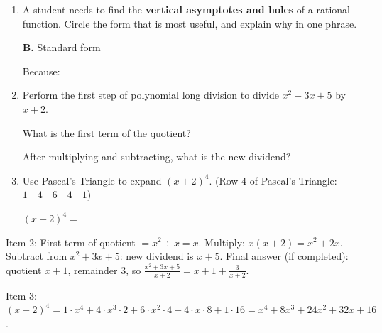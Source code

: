 \documentclass[10pt]{article}
\begin{document}
\namedateperiod

\vspace{0.14in}

\begin{enumerate}[itemsep=16pt]

\item A student needs to find the \textbf{vertical asymptotes and holes} of a rational function.
      Circle the form that is most useful, and explain why in one phrase.

      \medskip
       \qquad\qquad \textbf{B.} Standard form

      \vspace{0.06in}
      Because: 

\item Perform the first step of polynomial long division to divide $x^2 + 3x + 5$ by $x + 2$.

      What is the first term of the quotient? 

      After multiplying and subtracting, what is the new dividend? 

\item Use Pascal's Triangle to expand $(x + 2)^4$.
      (Row 4 of Pascal's Triangle: $1 \quad 4 \quad 6 \quad 4 \quad 1$)

      \vspace{0.06in}
      $(x+2)^4 = $ 

\end{enumerate}

\begin{teachernote}
Item 2: First term of quotient $= x^2 \div x = x$. Multiply: $x(x+2) = x^2+2x$. Subtract from $x^2+3x+5$: new dividend is $x+5$. Final answer (if completed): quotient $x+1$, remainder $3$, so $\frac{x^2+3x+5}{x+2} = x+1+\frac{3}{x+2}$.

Item 3: $(x+2)^4 = 1\cdot x^4 + 4\cdot x^3\cdot 2 + 6\cdot x^2\cdot 4 + 4\cdot x\cdot 8 + 1\cdot 16 = x^4+8x^3+24x^2+32x+16$.
\end{teachernote}
\end{document}
